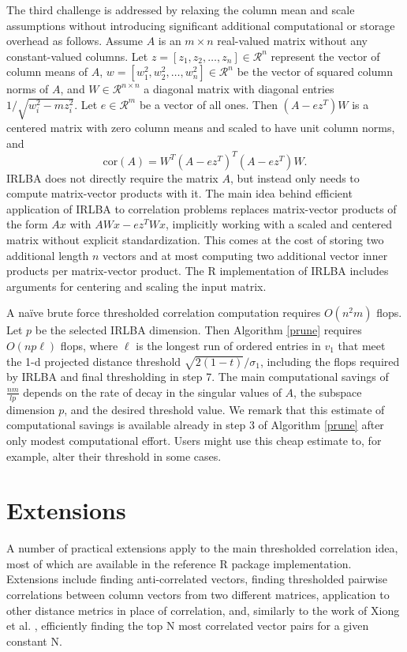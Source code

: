 \documentclass{article}
\let\proglang=\textsf
\numberwithin{algorithmctr}{section}
\begin{document}
The third challenge is addressed by relaxing the column mean and scale
assumptions without introducing significant additional computational or storage
overhead as follows. Assume $A$ is an $m\times n$ real-valued matrix without
any constant-valued columns. Let $z=[z_1,z_2,\ldots,z_n]\in\mathcal{R}^n$
represent the vector of column means of $A$,
$w=[w_1^2,w_2^2,\ldots,w_n^2]\in\mathcal{R}^n$ be the vector of squared column
norms of $A$, and $W\in\mathcal{R}^{n\times n}$ a diagonal matrix with diagonal
entries $1/\sqrt{w_i^2 - m z_i^2}$.  Let $e\in\mathcal{R}^m$ be a vector of all
ones.  Then $(A - ez^T)W$ is a centered matrix with zero column means and
scaled to have unit column norms, and
\[
\mathrm{cor}(A) = W^T (A-ez^T)^T (A-ez^T) W.
\]
IRLBA does not directly require the matrix $A$, but instead only needs to
compute matrix-vector products with it.  The main idea behind efficient
application of IRLBA to correlation problems replaces matrix-vector products of
the form $Ax$ with $AWx - ez^TWx$, implicitly working with a scaled and
centered matrix without explicit standardization. This comes at the cost of
storing two additional length $n$ vectors and at most computing two additional
vector inner products per matrix-vector product.  The \proglang{R}
implementation \cite{irlbar} of IRLBA includes arguments for centering and
scaling the input matrix.


A na\"ive brute force thresholded correlation computation requires $O(n^2 m)$
flops.  Let $p$ be the selected IRLBA dimension. Then Algorithm \ref{prune}
requires $O(n p \ell)$ flops, where $\ell$ is the longest run of ordered
entries in $v_1$ that meet the 1-d projected distance threshold
$\sqrt{2(1-t)}/\sigma_1$, including the flops required by IRLBA and final
thresholding in step 7.  The main computational savings of $\frac{nm}{lp}$
depends on the rate of decay in the singular values of $A$, the subspace
dimension $p$, and the desired threshold value. We remark that this estimate of
computational savings is available already in step 3 of Algorithm \ref{prune}
after only modest computational effort. Users might use this cheap estimate to,
for example, alter their threshold in some cases.


\section{Extensions}\label{extensions}

A number of practical extensions apply to the main thresholded correlation
idea, most of which are available in the reference R package implementation.
Extensions include finding anti-correlated vectors, finding thresholded
pairwise correlations between column vectors from two different matrices,
application to other distance metrics in place of correlation, and, similarly
to the work of Xiong et al. \cite{prune2}, efficiently finding the top N most
correlated vector pairs for a given constant N.
\end{document}
